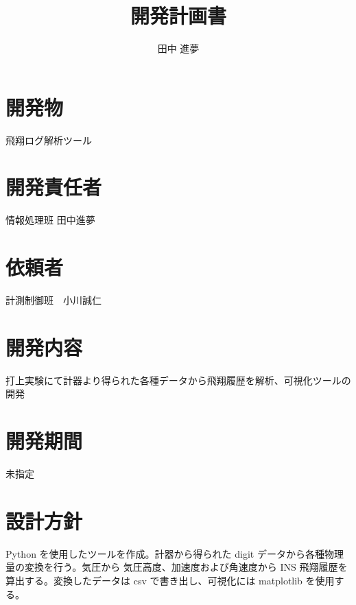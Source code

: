 \documentclass[10pt,a4paper]{jsarticle}
\begin{document}
	
	\title{開発計画書}
	\author{田中 進夢}
	\maketitle
	
	
	\section{開発物}
	飛翔ログ解析ツール
	
	\section{開発責任者}
	情報処理班 田中進夢
	
	\section{依頼者}
	計測制御班　小川誠仁
	
	\section{開発内容}
	打上実験にて計器より得られた各種データから飛翔履歴を解析、可視化ツールの開発
	
	\section{開発期間}
	未指定
	
	\section{設計方針}
	Python を使用したツールを作成。計器から得られた digit データから各種物理量の変換を行う。気圧から
	気圧高度、加速度および角速度から INS 飛翔履歴を算出する。変換したデータは csv で書き出し、可視化には matplotlib を使用する。
	
	
	
	
	\newpage
\end{document}
